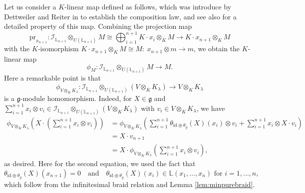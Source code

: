 \documentclass[a4paper,12pt]{article}
\theoremstyle{definition}
\theoremstyle{remark}
\begin{document}
Let us  
consider a $K$-linear map defined as follows, 
which was introduce by Dettweiler and Reiter in \cite{DR00} to 
establish the composition law, and 
see also \cite{Harbook} for a detailed property of this map.
Combining the projection map  
\[
	\mathrm{pr}_{x_{n+1}}\colon \mathcal{I}_{\mathbb{L}_{n+1}}\otimes_{U(\mathbb{L}_{n+1})} M
	\cong \bigoplus_{i=1}^{n+1} K\cdot x_{i}\otimes_{K} M
	\longrightarrow K\cdot x_{n+1}\otimes_{K} M
\]
with the  $K$-isomorphism $K\cdot x_{n+1}\otimes_{K} M\cong M
:\ x_{n+1}\otimes m\to m$,
we obtain the $K$-linear map
\[
	\phi_{M} \colon \mathcal{I}_{\mathbb{L}_{n+1}}\otimes_{U(\mathbb{L}_{n+1})} M
	\rightarrow M.
\]
Here a remarkable point is that 
\[
	\phi_{V\otimes_{K}K_{\lambda}}\colon     
\mathcal{I}_{\mathbb{L}_{n+1}}\otimes_{U(\mathbb{L}_{n+1})} (V\otimes_{K}K_{\lambda})
\rightarrow V\otimes_{K}K_{\lambda}
\]
is a $\mathfrak{g}$-module homomorphism.
Indeed, for $X\in \mathfrak{g}$ and 
$\sum_{i=1}^{n+1} x_i\otimes v_{i}\in \mathcal{I}_{\mathbb{L}_{n+1}}\otimes_{U(\mathbb{L}_{n+1})} (V\otimes_{K}K_{\lambda})$
with $v_{i}\in V\otimes_{K}K_{\lambda}$, we have
\begin{align*}
	\phi_{V\otimes_{K}K_{\lambda}}(X\cdot (\sum_{i=1}^{n+1} x_i\otimes v_{i}))
	&=\phi_{V\otimes_{K}K_{\lambda}}(\sum_{i=1}^{n+1} \theta_{\mathrm{id}\oplus \theta_{g}}(X)(x_i)\otimes v_{i}+\sum_{i=1}^{n+1} x_i\otimes X\cdot v_{i})\\
	&= X\cdot v_{n+1}\\
	&=X\cdot \phi_{V\otimes_{K}K_{\lambda}}(\sum_{i=1}^{n+1} x_i\otimes v_{i}),
\end{align*}
as desired.
Here for the second equation, we used the fact that
\[
	\theta_{\mathrm{id}\oplus \theta_{g}}(X)(x_{n+1})=0\quad \text{and}\quad \theta_{\mathrm{id}\oplus \theta_{g}}(X)(x_{i})\in \mathbb{L}(x_{1},\ldots,x_{n})
	\text{ for }i=1,\ldots,n,
\]
which follow from the infinitesimal braid relation and Lemma \ref{lem:minpurebraid}.
\end{document}
